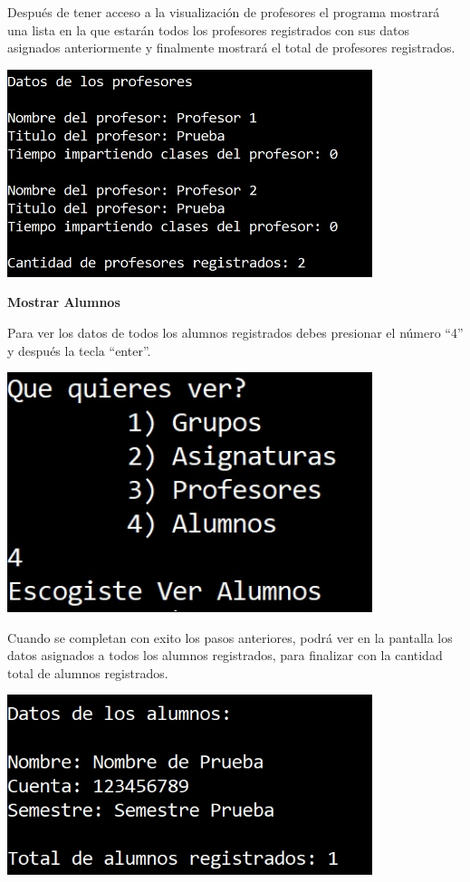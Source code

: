 \documentclass[12pt]{report}
\begin{document}
Después de tener acceso a la visualización de profesores el programa mostrará una lista en la que estarán todos los profesores registrados con sus datos asignados anteriormente y finalmente mostrará el total de profesores registrados.

\begin{center}
    \includegraphics[width=0.8\textwidth]{img/Opcion 6 P2_3_1.jpg}
\end{center}

\newpage
\hspace{1cm} \textbf{Mostrar Alumnos}

Para ver los datos de todos los alumnos registrados debes presionar el número ``4'' y después la tecla ``enter''. 

\begin{center}
    \includegraphics[width=0.8\textwidth]{img/Opcion 6 P2_4.jpg}
\end{center}

Cuando se completan con exito los pasos anteriores, podrá ver en la pantalla los datos asignados a todos los alumnos registrados, para finalizar con la cantidad total de alumnos registrados.

\begin{center}
    \includegraphics[width=0.8\textwidth]{img/Opcion 6 P2_4_1.jpg}
\end{center}
\end{document}
